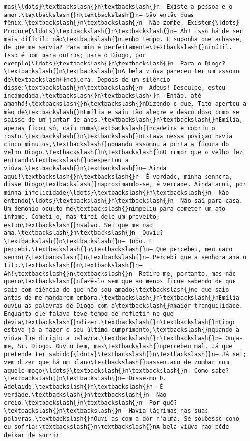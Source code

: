 \begin{Verbatim}[commandchars=\\\{\}]
mas{\ldots}\textbackslash{}n\textbackslash{}n— Existe a pessoa e o amor.\textbackslash{}n\textbackslash{}n— São então duas fênix.\textbackslash{}n\textbackslash{}n— Não zombe. Existem{\ldots} Procure{\ldots}\textbackslash{}n\textbackslash{}n— Ah! isso há de ser mais difícil: não\textbackslash{}ntenho tempo. E suponha que achasse, de que me servia? Para mim é perfeitamente\textbackslash{}ninútil. Isso é bom para outros; para o Diogo, por exemplo{\ldots}\textbackslash{}n\textbackslash{}n— Para o Diogo?\textbackslash{}n\textbackslash{}nA bela viúva pareceu ter um assomo de\textbackslash{}ncólera. Depois de um silêncio disse:\textbackslash{}n\textbackslash{}n— Adeus! Desculpe, estou incomodada.\textbackslash{}n\textbackslash{}n— Então, até amanhã!\textbackslash{}n\textbackslash{}nDizendo o que, Tito apertou a mão de\textbackslash{}nEmília e saiu tão alegre e descuidoso como se saísse de um jantar de anos.\textbackslash{}n\textbackslash{}nEmília, apenas ficou só, caiu numa\textbackslash{}ncadeira e cobriu o rosto.\textbackslash{}n\textbackslash{}nEstava nessa posição havia cinco minutos,\textbackslash{}nquando assomou à porta a figura do velho Diogo.\textbackslash{}n\textbackslash{}nO rumor que o velho fez entrando\textbackslash{}ndespertou a viúva.\textbackslash{}n\textbackslash{}n— Ainda aqui!\textbackslash{}n\textbackslash{}n— É verdade, minha senhora, disse Diogo\textbackslash{}naproximando-se, é verdade. Ainda aqui, por minha infelicidade{\ldots}\textbackslash{}n\textbackslash{}n— Não entendo{\ldots}\textbackslash{}n\textbackslash{}n— Não saí para casa. Um demônio oculto me\textbackslash{}nimpeliu para cometer um ato infame. Cometi-o, mas tirei dele um proveito; estou\textbackslash{}nsalvo. Sei que me não ama.\textbackslash{}n\textbackslash{}n— Ouviu?\textbackslash{}n\textbackslash{}n— Tudo. E percebi.\textbackslash{}n\textbackslash{}n— Que percebeu, meu caro senhor?\textbackslash{}n\textbackslash{}n— Percebi que a senhora ama o Tito.\textbackslash{}n\textbackslash{}n— Ah!\textbackslash{}n\textbackslash{}n— Retiro-me, portanto, mas não quero\textbackslash{}nfazê-lo sem que ao menos fique sabendo de que saio com ciência de que não sou amado;\textbackslash{}ne que saio antes de me mandarem embora.\textbackslash{}n\textbackslash{}nEmília ouviu as palavras de Diogo com a\textbackslash{}nmaior tranqüilidade. Enquanto ele falava teve tempo de refletir no que devia\textbackslash{}ndizer.\textbackslash{}n\textbackslash{}nDiogo estava já a fazer o seu último cumprimento,\textbackslash{}nquando a viúva lhe dirigiu a palavra.\textbackslash{}n\textbackslash{}n— Ouça-me, Sr. Diogo. Ouviu bem, mas\textbackslash{}npercebeu mal. Já que pretende ter sabido{\ldots}\textbackslash{}n\textbackslash{}n— Já sei; vem dizer que há um plano\textbackslash{}nassentado de zombar com aquele moço{\ldots}\textbackslash{}n\textbackslash{}n— Como sabe?\textbackslash{}n\textbackslash{}n— Disse-mo D. Adelaide.\textbackslash{}n\textbackslash{}n— É verdade.\textbackslash{}n\textbackslash{}n— Não creio.\textbackslash{}n\textbackslash{}n— Por quê?\textbackslash{}n\textbackslash{}n— Havia lágrimas nas suas palavras.\textbackslash{}nOuvi-as com a dor n’alma. Se soubesse como eu sofria!\textbackslash{}n\textbackslash{}nA bela viúva não pôde deixar de sorrir 
\end{Verbatim}
